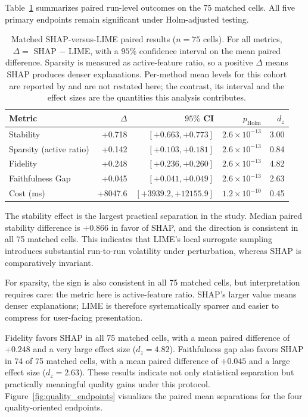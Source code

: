 \documentclass[10pt]{article}
\begin{document}
Table~\ref{tab:paired_main} summarizes paired run-level outcomes on the
75 matched cells. All five primary endpoints remain significant under
Holm-adjusted testing.

\begin{table}[t]
\centering
\caption{Matched SHAP-versus-LIME paired results ($n=75$ cells). For all
metrics, $\Delta = $ SHAP $-$ LIME, with a $95\%$ confidence interval on the
mean paired difference. Sparsity is measured as active-feature ratio, so a
positive $\Delta$ means SHAP produces denser explanations. Per-method mean
levels for this cohort are reported by \citet{herrera2026framework} and are
not restated here; the contrast, its interval and the effect sizes are the
quantities this analysis contributes.}
\label{tab:paired_main}
\begin{tabular}{lrrrr}
\toprule
Metric & $\Delta$ & $95\%$ CI & $p_{\mathrm{Holm}}$ & $d_z$ \\
\midrule
Stability & +0.718 & $[+0.663, +0.773]$ & $2.6\times10^{-13}$ & 3.00 \\
Sparsity (active ratio) & +0.142 & $[+0.103, +0.181]$ & $2.6\times10^{-13}$ & 0.84 \\
Fidelity & +0.248 & $[+0.236, +0.260]$ & $2.6\times10^{-13}$ & 4.82 \\
Faithfulness Gap & +0.045 & $[+0.041, +0.049]$ & $2.6\times10^{-13}$ & 2.63 \\
Cost (ms) & +8047.6 & $[+3939.2, +12155.9]$ & $1.2\times10^{-10}$ & 0.45 \\
\bottomrule
\end{tabular}
\end{table}

The stability effect is the largest practical separation in the study.
Median paired stability difference is $+0.866$ in favor of SHAP, and the
direction is consistent in all 75 matched cells. This indicates that
LIME's local surrogate sampling introduces substantial run-to-run
volatility under perturbation, whereas SHAP is comparatively invariant.

For sparsity, the sign is also consistent in all 75 matched cells, but
interpretation requires care: the metric here is active-feature ratio.
SHAP's larger value means denser explanations; LIME is therefore
systematically sparser and easier to compress for user-facing presentation.

Fidelity favors SHAP in all 75 matched cells, with a mean paired
difference of $+0.248$ and a very large effect size ($d_z = 4.82$).
Faithfulness gap also favors SHAP in 74 of 75 matched cells, with a mean
paired difference of $+0.045$ and a large effect size ($d_z = 2.63$).
These results indicate not only statistical separation but practically
meaningful quality gains under this protocol.
Figure~\ref{fig:quality_endpoints} visualizes the paired mean separations
for the four quality-oriented endpoints.
\end{document}
